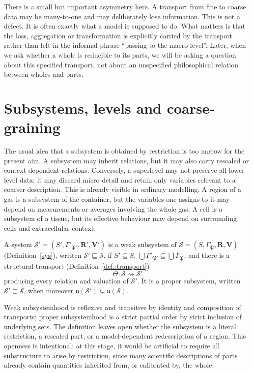 \documentclass[runningheads]{llncs}
\begin{document}
There is a small but important asymmetry here. A transport from fine to coarse data may be many-to-one and may deliberately lose information. This is not a defect. It is often exactly what a model is supposed to do. What matters is that the loss, aggregation or transformation is explicitly carried by the transport rather than left in the informal phrase ``passing to the macro level''. Later, when we ask whether a whole is reducible to its parts, we will be asking a question about this specified transport, not about an unspecified philosophical relation between wholes and parts.

\section{Subsystems, levels and coarse-graining}

The usual idea that a subsystem is obtained by restriction is too narrow for the present aim. A subsystem may inherit relations, but it may also carry rescaled or context-dependent relations. Conversely, a superlevel may not preserve all lower-level data: it may discard micro-detail and retain only variables relevant to a coarser description. This is already visible in ordinary modelling. A region of a gas is a subsystem of the container, but the variables one assigns to it may depend on measurements or averages involving the whole gas. A cell is a subsystem of a tissue, but its effective behaviour may depend on surrounding cells and extracellular context.

\begin{definition}[Subsystem]\label{def::subsyst}
A system $\mathcal S'=(S',\Gamma'_{\mathfrak P'},\mathbf R',\mathbf V')$ is a weak subsystem of $\mathcal S=(S,\Gamma_{\mathfrak P},\mathbf R,\mathbf V)$ (Definition~\ref{sys}), written $\mathcal S'\sqsubseteq\mathcal S$, if $S'\subseteq S$, $\bigcup\Gamma'_{\mathfrak P'}\subseteq\bigcup\Gamma_{\mathfrak P}$, and there is a structural transport (Definition~\ref{def::transport})
\[
\Theta:\mathcal S\rightsquigarrow\mathcal S'
\]
producing every relation and valuation of $\mathcal S'$. It is a proper subsystem, written $\mathcal S'\sqsubset\mathcal S$, when moreover $\mathfrak u(\mathcal S')\subsetneq\mathfrak u(\mathcal S)$.
\end{definition}

Weak subsystemhood is reflexive and transitive by identity and composition of transports; proper subsystemhood is a strict partial order by strict inclusion of underlying sets. The definition leaves open whether the subsystem is a literal restriction, a rescaled part, or a model-dependent redescription of a region. This openness is intentional: at this stage, it would be artificial to require all substructure to arise by restriction, since many scientific descriptions of parts already contain quantities inherited from, or calibrated by, the whole.
\end{document}
